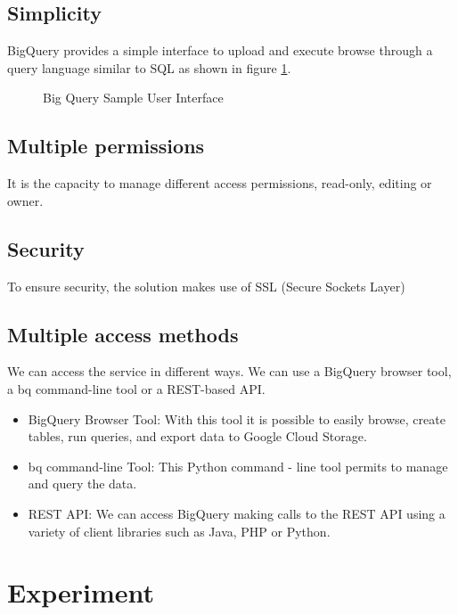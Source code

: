 \documentclass[9pt,twocolumn,twoside]{../../styles/osajnl}
\begin{document}
\subsection{Simplicity}
BigQuery provides a simple interface to upload and execute browse
through a query language similar to SQL as shown in figure \ref{fig:bigqueryinterface}.

\begin{figure}[htbp]
\centering
{}
\caption{\cite{www-userinterface-bigquery} Big Query Sample User Interface}
\label{fig:bigqueryinterface}
\end{figure}

\subsection{Multiple permissions}
It is the capacity to manage different access permissions, read-only,
editing or owner.

\subsection{Security}
To ensure security, the solution makes use of SSL (Secure Sockets Layer)

\subsection{Multiple access methods}
We can access the service in different ways. We can use a BigQuery
browser tool, a bq command-line tool or a REST-based
API. \begin{itemize}
\item BigQuery Browser Tool: With this tool it is possible to easily browse,
create tables, run queries, and export data to Google Cloud Storage.
\item bq command-line Tool: This Python command - line tool permits to
  manage and query the data. \item REST API: We can access BigQuery
  making calls to the REST API using a variety of client libraries
  such as Java, PHP or Python.  \end{itemize}


\section{Experiment}
\end{document}
